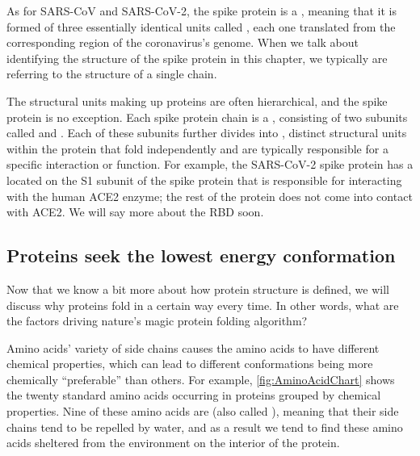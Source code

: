 As for SARS-CoV and SARS-CoV-2, the spike protein is a , meaning that it is formed of three essentially identical units called , each one translated from the corresponding region of the coronavirus's genome. When we talk about identifying the structure of the spike protein in this chapter, we typically are referring to the structure of a single chain.

The structural units making up proteins are often hierarchical, and the spike protein is no exception. Each spike protein chain is a , consisting of two subunits called  and . Each of these subunits further divides into , distinct structural units within the protein that fold independently and are typically responsible for a specific interaction or function. For example, the SARS-CoV-2 spike protein has a  located on the S1 subunit of the spike protein that is responsible for interacting with the human ACE2 enzyme; the rest of the protein does not come into contact with ACE2. We will say more about the RBD soon.

\FloatBarrier
\subsection{Proteins seek the lowest energy conformation}

Now that we know a bit more about how protein structure is defined, we will discuss why proteins fold in a certain way every time. In other words, what are the factors driving nature's magic protein folding algorithm?

Amino acids' variety of side chains causes the amino acids to have different chemical properties, which can lead to different conformations being more chemically ``preferable'' than others. For example, \autoref{fig:AminoAcidChart} shows the twenty standard amino acids occurring in proteins grouped by chemical properties. Nine of these amino acids are  (also called ), meaning that their side chains tend to be repelled by water, and as a result we tend to find these amino acids sheltered from the environment on the interior of the protein.

